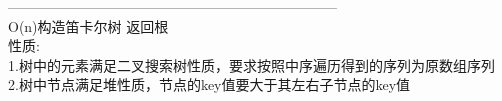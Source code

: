 ﻿-----------------------------------------------------------------------\\
O(n)构造笛卡尔树 返回根\\
性质:\\
1.树中的元素满足二叉搜索树性质，要求按照中序遍历得到的序列为原数组序列\\
2.树中节点满足堆性质，节点的key值要大于其左右子节点的key值
